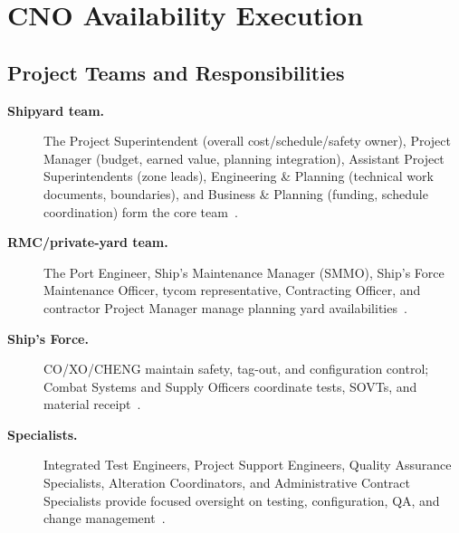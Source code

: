 \documentclass[../main.tex]{subfiles}
\begin{document}
\section{CNO Availability Execution}
\minibib

\subsection{Project Teams and Responsibilities}
\begin{description}
\item[\textbf{Shipyard team.}] The Project Superintendent (overall cost/schedule/safety owner), Project Manager (budget, earned value, planning integration), Assistant Project Superintendents (zone leads), Engineering \& Planning (technical work documents, boundaries), and Business \& Planning (funding, schedule coordination) form the core team~\autocite{edo-4-2-2-cno-availability-execution-2025}.
\item[\textbf{RMC/private-yard team.}] The Port Engineer, Ship's Maintenance Manager (SMMO), Ship's Force Maintenance Officer, \ac{tycom} representative, Contracting Officer, and contractor Project Manager manage planning yard availabilities~\autocite{edo-4-2-2-cno-availability-execution-2025}.
\item[\textbf{Ship's Force.}] CO/XO/CHENG maintain safety, tag-out, and configuration control; Combat Systems and Supply Officers coordinate tests, SOVTs, and material receipt~\autocite{COMFLTFORCOMINST4790-3}.
\item[\textbf{Specialists.}] Integrated Test Engineers, Project Support Engineers, Quality Assurance Specialists, Alteration Coordinators, and Administrative Contract Specialists provide focused oversight on testing, configuration, QA, and change management~\autocite{edo-4-2-2-cno-availability-execution-2025}.
\end{description}
\end{document}
